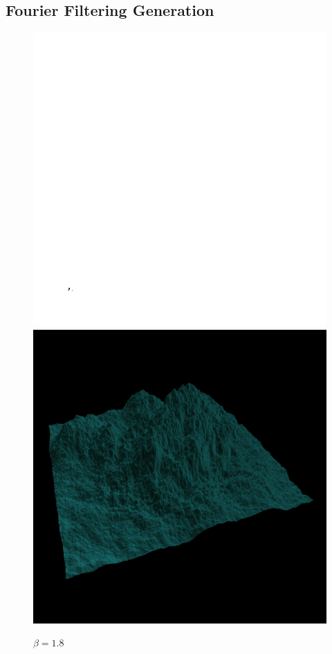     \subsection {Fourier Filtering Generation}
		
		\begin{figure}[H]
		  \centering
		  \includegraphics[width=\imagewidth]{images/results/terrains/512-1/fourier/18}
		  \includegraphics[width=\imagewidth]{images/results/terrains/512-1/fourier/18_3d}
		  \caption{$\beta = 1.8$}
		  \label{fig:ex-fourier18-surface}
		\end{figure}
		
